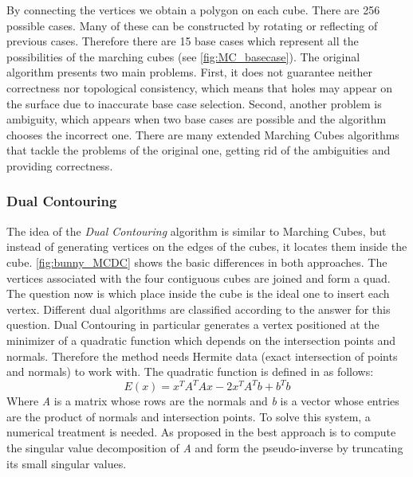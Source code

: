 By connecting the vertices we obtain a polygon on each cube. There are 256 possible cases. Many of these can be constructed by rotating or reflecting of previous cases.  Therefore  
there are 15 base cases which represent all the possibilities of the marching cubes (see \autoref{fig:MC_basecase}). 
The original algorithm presents two main problems. First, it does not guarantee neither
correctness nor topological consistency, which means that holes may appear on the surface due
to inaccurate base case selection. Second, another problem is ambiguity, which appears when two
base cases are possible and the algorithm chooses the incorrect one. There are many extended Marching Cubes
algorithms that tackle the problems of the original one, getting rid of the ambiguities and
providing correctness.  

\subsubsection{Dual Contouring}
The idea of the \emph{Dual Contouring} algorithm is similar to Marching Cubes, but instead of generating vertices on the
edges of the cubes, it locates them inside the cube. \autoref{fig:bunny_MCDC} shows the basic differences in both approaches.
The vertices associated with the four contiguous cubes are joined and form a quad. The question now is
which place inside the cube is the ideal one to insert each vertex. Different dual algorithms are classified 
according to the answer for this question. Dual Contouring in particular generates a vertex positioned at the minimizer of a
quadratic function which depends on the intersection points and normals. Therefore the method needs Hermite 
data (exact intersection of points and normals) to work with. 
The quadratic function is defined in \cite{Hermite2002} as follows:
\begin{equation*}
E(x)= x^TA^TAx-2x^TA^Tb+b^Tb
\end{equation*}
Where \textit{A} is a matrix whose rows are the normals and \textit{b} is a vector whose entries are the product of normals and intersection points. To solve this system, a numerical treatment is needed. As proposed in \cite{Hermite2002} the best approach is to compute the
singular value decomposition of \textit{A} and form the pseudo-inverse by truncating its small singular values. 



